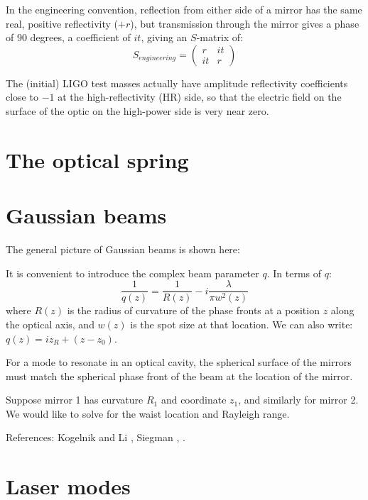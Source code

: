 In the engineering convention, reflection from either side of a mirror
has the same real, positive reflectivity ($+r$), but transmission
through the mirror gives a phase of 90 degrees, a coefficient of $it$, 
giving an $S$-matrix of:
%
\begin{equation}
S_{engineering}=\left(\begin{array}{cc}
 r & it\\
it & r
\end{array}\right)
\label{eq:Smatrix-engr}
\end{equation}

The (initial) LIGO test masses actually have amplitude reflectivity
coefficients close to $-1$ at the high-reflectivity (HR) side, so
that the electric field on the surface of the optic on the high-power
side is very near zero.%

\section{The optical spring}



\section{Gaussian beams}

The general picture of Gaussian beams is shown here:

It is convenient to introduce the complex beam parameter $q$.  In terms of $q$:
\begin{equation}
\frac{1}{q(z)} = \frac{1}{R(z)} - i \frac{\lambda}{\pi w^2(z)}
\end{equation}
where $R(z)$ is the radius of curvature of the phase fronts at a
position $z$ along the optical axis, and $w(z)$ is the spot size at
that location.  We can also write:
$q(z) = i z_R + (z - z_0)$.

For a mode to resonate in an optical cavity, the spherical surface of
the mirrors must match the spherical phase front of the beam at the
location of the mirror.

Suppose mirror 1 has curvature $R_1$ and coordinate $z_1$, and
similarly for mirror 2.  We would like to solve for the waist location
and Rayleigh range.

References: Kogelnik and Li \cite{Kogelnik1966Laser}, Siegman \cite{Siegman1990Lasers}, \cite{Rudiger1998Phase,Fox1961Resonant}.

\section{Laser modes}

